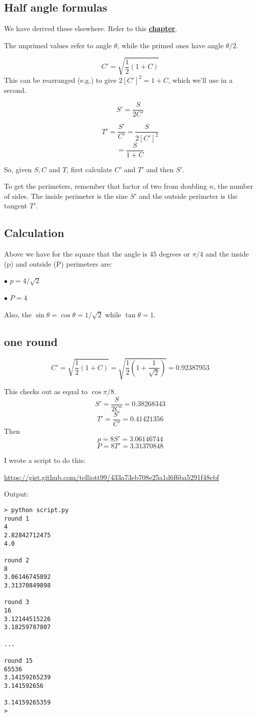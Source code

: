 \documentclass[11pt, oneside]{article}
\begin{document}
\subsection*{Half angle formulas}

We have derived these elsewhere.  Refer to this \hyperref[sec:double_half_angles]{\textbf{chapter}}.

The unprimed values refer to angle $\theta$, while the primed ones have angle $\theta/2$.

\[ C' = \sqrt{\frac{1}{2} (1 + C)}  \]
This can be rearranged (e.g.) to give $2[C']^2 = 1 + C$, which we'll use in a second.

\[ S' = \frac{S}{2 C'} \]

\[ T' = \frac{S'}{C'} = \frac{S}{2 [C']^2} \]
\[  = \frac{S}{1 + C} \]

So, given $S, C$ and $T$, first calculate $C'$ and $T'$ and then $S'$.  

To get the perimeters, remember that factor of two from doubling $n$, the number of sides.  The inside perimeter is the sine $S'$ and the outside perimeter is the tangent $T'$.

\subsection*{Calculation}

Above we have for the square that the angle is $45$ degrees or $\pi/4$ and the inside (p) and outside (P) perimeters are:

$\bullet$  $p = 4/\sqrt{2}$

$\bullet$  $P = 4$

Also, the $\sin \theta = \cos \theta = 1/\sqrt{2}$ while $\tan \theta = 1$.

\subsection*{one round}
\[ C' = \sqrt{\frac{1}{2} (1 + C)} = \sqrt{\frac{1}{2} (1 + \frac{1}{\sqrt{2}} )} = 0.92387953 \]

This checks out as equal to $\cos \pi/8$.
\[ S' = \frac{S}{2 C'} = 0.38268343 \]
\[ T' = \frac{S'}{C'} = 0.41421356 \]
Then
\[ p = 8 S' = 3.06146744 \]
\[ P = 8 T' = 3.31370848 \]

I wrote a script to do this:

\url{https://gist.github.com/telliott99/433a73eb708e25a1d6f6ba5291f48ebf}

Output:

\begin{verbatim}
> python script.py 
round 1
4
2.82842712475
4.0

round 2
8
3.06146745892
3.31370849898

round 3
16
3.12144515226
3.18259787807

...

round 15
65536
3.14159265239
3.141592656

3.14159265359
> 

\end{verbatim}
\end{document}
